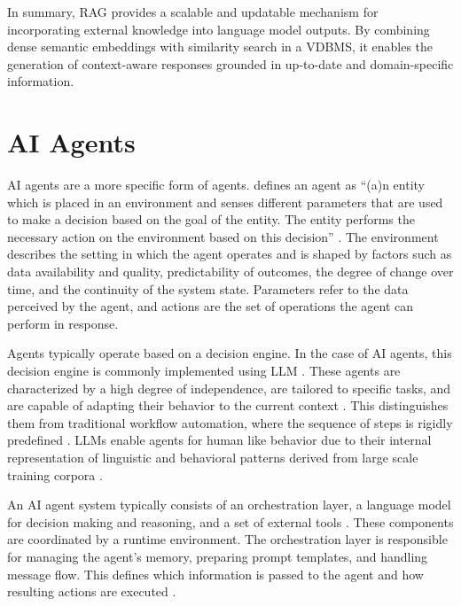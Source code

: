 \documentclass[a4paper,oneside,bibliography=totoc]{scrbook}
\begin{document}
In summary, \ac{RAG} provides a scalable and updatable mechanism for incorporating external knowledge into language model outputs. By combining dense semantic embeddings with similarity search in a \ac{VDBMS}, it enables the generation of context-aware responses grounded in up-to-date and domain-specific information.

\section{AI Agents}
\label{sec:ai_agents}

\ac{AI} agents are a more specific form of agents. \citet{Dorri2018} defines an agent as \enquote{(a)n entity which is placed in an environment and senses different parameters that are used to make a decision based on the goal of the entity. The entity performs the necessary action on the environment based on this decision} \cite[S. 28574]{Dorri2018}. The environment describes the setting in which the agent operates and is shaped by factors such as data availability and quality, predictability of outcomes, the degree of change over time, and the continuity of the system state. Parameters refer to the data perceived by the agent, and actions are the set of operations the agent can perform in response.

Agents typically operate based on a decision engine. In the case of \ac{AI} agents, this decision engine is commonly implemented using \ac{LLM} \cite{Sapkota2025,Park2023}. These agents are characterized by a high degree of independence, are tailored to specific tasks, and are capable of adapting their behavior to the current context \cite{Sapkota2025,OpenAI2025}. This distinguishes them from traditional workflow automation, where the sequence of steps is rigidly predefined \cite{Anthropic2024}. \acp{LLM} enable agents for human like behavior due to their internal representation of linguistic and behavioral patterns derived from large scale training corpora \cite{Park2023}.

An \ac{AI} agent system typically consists of an orchestration layer, a language model for decision making and reasoning, and a set of external tools \cite{Wiesinger2025,OpenAI2025}. These components are coordinated by a runtime environment. The orchestration layer is responsible for managing the agent's memory, preparing prompt templates, and handling message flow. This defines which information is passed to the agent and how resulting actions are executed \cite{Wiesinger2025}.
\end{document}
